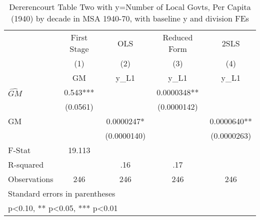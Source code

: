 \begin{table}[htbp]\centering
\def\sym#1{\ifmmode^{#1}\else\(^{#1}\)\fi}
\caption{Dererencourt Table Two with y=Number of Local Govts, Per Capita (1940) by decade in MSA 1940-70, with baseline y and division FEs}
\begin{tabular}{l*{4}{c}}
\toprule
                    & First Stage   &         OLS   &Reduced Form   &        2SLS   \\
                    &\multicolumn{1}{c}{(1)}&\multicolumn{1}{c}{(2)}&\multicolumn{1}{c}{(3)}&\multicolumn{1}{c}{(4)}\\
                    &\multicolumn{1}{c}{GM}&\multicolumn{1}{c}{y\_L1}&\multicolumn{1}{c}{y\_L1}&\multicolumn{1}{c}{y\_L1}\\
\midrule
$\hat{GM}$          &       0.543***&               &   0.0000348** &               \\
                    &    (0.0561)   &               & (0.0000142)   &               \\
\addlinespace
GM                  &               &   0.0000247*  &               &   0.0000640** \\
                    &               & (0.0000140)   &               & (0.0000263)   \\
\midrule
F-Stat              &      19.113   &               &               &               \\
R-squared           &               &         .16   &         .17   &               \\
Observations        &         246   &         246   &         246   &         246   \\
\bottomrule
\multicolumn{5}{l}{\footnotesize Standard errors in parentheses}\\
\multicolumn{5}{l}{\footnotesize * p<0.10, ** p<0.05, *** p<0.01}\\
\end{tabular}
\end{table}
